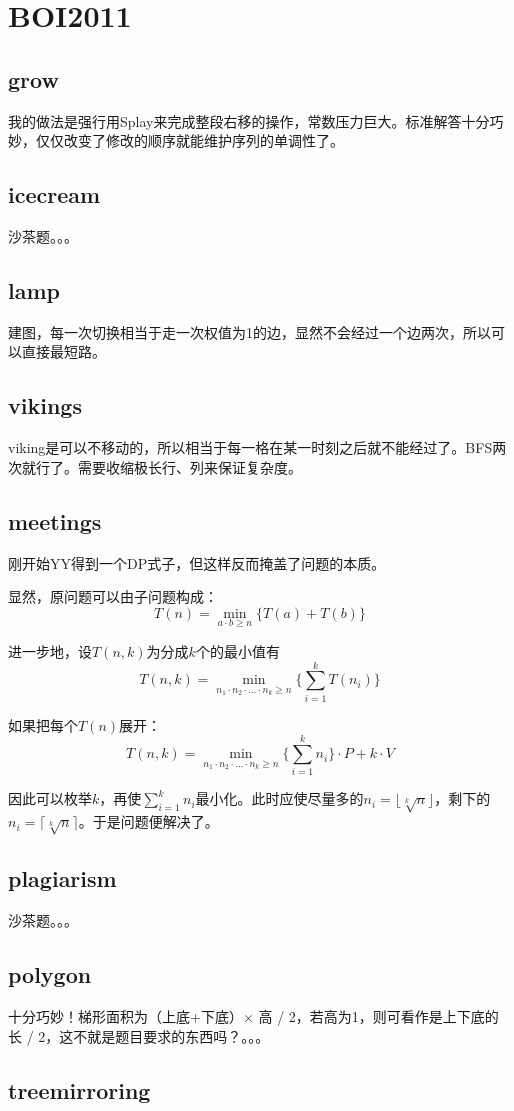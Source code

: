 \section{BOI2011}
\subsection{grow}
我的做法是强行用Splay来完成整段右移的操作，常数压力巨大。标准解答十分巧妙，仅仅改变了修改的顺序就能维护序列的单调性了。
\subsection{icecream}
沙茶题。。。
\subsection{lamp}
建图，每一次切换相当于走一次权值为1的边，显然不会经过一个边两次，所以可以直接最短路。
\subsection{vikings}
viking是可以不移动的，所以相当于每一格在某一时刻之后就不能经过了。BFS两次就行了。需要收缩极长行、列来保证复杂度。
\subsection{meetings}
刚开始YY得到一个DP式子，但这样反而掩盖了问题的本质。\par
显然，原问题可以由子问题构成：
\begin{displaymath}
T(n) = \min_{a \cdot b \geq n}\{ T(a) + T(b) \}
\end{displaymath}
\par 进一步地，设$T(n,k)$为分成$k$个的最小值有
\begin{displaymath}
T(n,k) = \min_{n_1 \cdot n_2 \cdot \ldots \cdot n_k \geq n}\{ \sum_{i=1}^{k} T(n_i) \} 
\end{displaymath}
\par 如果把每个$T(n)$展开：
\begin{displaymath}
T(n,k) = \min_{n_1 \cdot n_2 \cdot \ldots \cdot n_k \geq n}\{ \sum_{i=1}^{k} n_i\}\cdot P + k \cdot V  
\end{displaymath}
\par 因此可以枚举$k$，再使$\sum_{i=1}^{k} n_i$最小化。此时应使尽量多的$n_i = \lfloor \sqrt[k]{n} \rfloor$，剩下的$n_i = \lceil \sqrt[k]{n} \rceil$。于是问题便解决了。
\subsection{plagiarism}
沙茶题。。。
\subsection{polygon}
十分巧妙！梯形面积为（上底+下底）$\times$ 高 / 2，若高为1，则可看作是上下底的长 / 2，这不就是题目要求的东西吗？。。。
\subsection{treemirroring}
